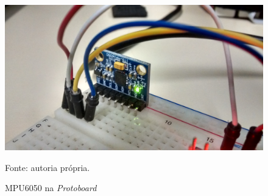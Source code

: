 	 	\begin{figure}[h]
	 		\centering
	 		\includegraphics[keepaspectratio=true,scale=0.15]{figuras/prototipo2.jpg}
	 		\caption{MPU6050 na \textit{Protoboard}}
	 		Fonte: autoria própria. 
	 		\label{prototipo1_2}	
	 	\end{figure}
	 	
